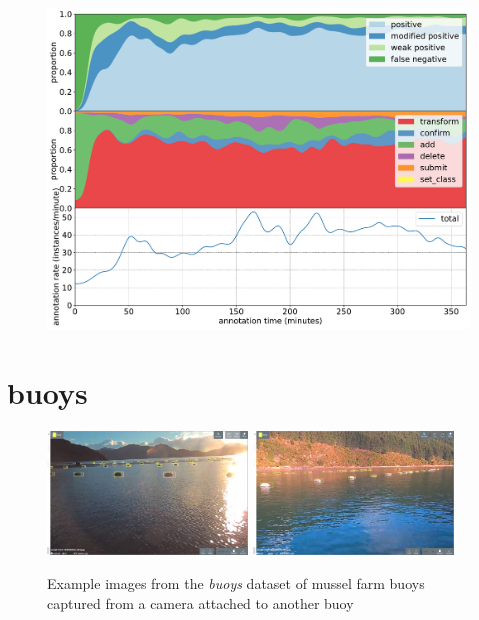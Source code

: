 \begin{figure}[!h]
\centering
\includegraphics[width=1.0\linewidth]{charts/action_annotations/apples2.pdf}
\caption{  }
\label{fig:apples2_annotation}
\end{figure}

\pagebreak
\section{buoys}
\label{sec:buoys_details}


\begin{figure}[H]
  \includegraphics[width=0.475\textwidth]{figures/annotation/screenshots/buoys.png}
  \hfill
  \includegraphics[width=0.475\textwidth]{figures/annotation/screenshots/buoys2.png}
  \caption{Example images from the \emph{buoys} dataset of mussel farm buoys captured from a camera attached to another buoy }
  \label{fig:buoys_dataset}
\end{figure}

